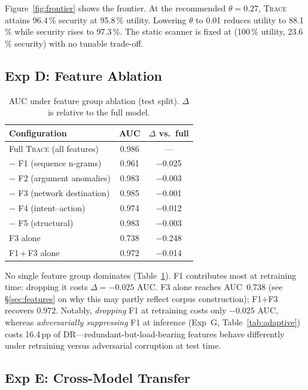 \documentclass[conference]{IEEEtran}
\begin{document}
Figure~\ref{fig:frontier} shows the frontier. At the recommended
$\theta=0.27$, \textsc{Trace} attains 96.4\,\% security at 95.8\,\%
utility. Lowering $\theta$ to 0.01 reduces utility to 88.1\,\% while
security rises to 97.3\,\%. The static scanner is fixed at
(100\,\% utility, 23.6\,\% security) with no tunable trade-off.

\subsection{Exp D: Feature Ablation}
\label{sec:exp_d}

\begin{table}[t]
\centering
\caption{AUC under feature group ablation (test split).
  $\Delta$ is relative to the full model.}
\label{tab:ablation}
\begin{tabular}{lcc}
\toprule
Configuration & AUC & $\Delta$ vs.\ full \\
\midrule
Full \textsc{Trace} (all features)  & 0.986 & --- \\
\quad $-$ F1 (sequence n-grams)     & 0.961 & $-$0.025 \\
\quad $-$ F2 (argument anomalies)   & 0.983 & $-$0.003 \\
\quad $-$ F3 (network destination)  & 0.985 & $-$0.001 \\
\quad $-$ F4 (intent--action)       & 0.974 & $-$0.012 \\
\quad $-$ F5 (structural)           & 0.983 & $-$0.003 \\
\midrule
F3 alone                            & 0.738 & $-$0.248 \\
F1\,+\,F3 alone                     & 0.972 & $-$0.014 \\
\bottomrule
\end{tabular}
\end{table}

No single feature group dominates (Table~\ref{tab:ablation}). F1
contributes most at retraining time: dropping it costs
$\Delta{=}{-}0.025$ AUC. F3 alone reaches AUC~0.738 (see
\S\ref{sec:features} on why this may partly reflect corpus
construction); F1$+$F3 recovers 0.972. Notably, \emph{dropping} F1 at
retraining costs only $-0.025$ AUC, whereas \emph{adversarially
suppressing} F1 at inference (Exp~G, Table~\ref{tab:adaptive}) costs
16.4\,pp of DR---redundant-but-load-bearing features behave
differently under retraining versus adversarial corruption at test
time.

\subsection{Exp E: Cross-Model Transfer}
\label{sec:exp_e}
\end{document}
